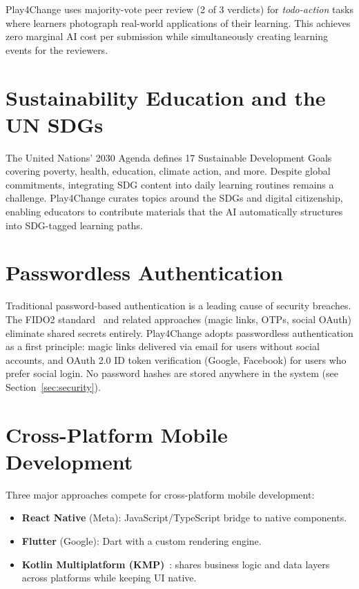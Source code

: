 Play4Change uses majority-vote peer review (2 of 3 verdicts) for \emph{todo-action} tasks where learners photograph real-world applications of their learning. This achieves zero marginal AI cost per submission while simultaneously creating learning events for the reviewers.

\section{Sustainability Education and the UN SDGs}
\label{sec:sdgs}

The United Nations' 2030 Agenda defines 17 Sustainable Development Goals~\cite{unsdgs2015} covering poverty, health, education, climate action, and more. Despite global commitments, integrating SDG content into daily learning routines remains a challenge. Play4Change curates topics around the SDGs and digital citizenship, enabling educators to contribute materials that the AI automatically structures into SDG-tagged learning paths.

\section{Passwordless Authentication}
\label{sec:passwordless}

Traditional password-based authentication is a leading cause of security breaches. The FIDO2 standard~\cite{fido2} and related approaches (magic links, OTPs, social OAuth) eliminate shared secrets entirely. Play4Change adopts passwordless authentication as a first principle: magic links delivered via email for users without social accounts, and OAuth 2.0 ID token verification (Google, Facebook) for users who prefer social login. No password hashes are stored anywhere in the system (see Section~\ref{sec:security}).

\section{Cross-Platform Mobile Development}
\label{sec:crossplatform}

Three major approaches compete for cross-platform mobile development:

\begin{itemize}
    \item \textbf{React Native} (Meta): JavaScript/TypeScript bridge to native components.
    \item \textbf{Flutter} (Google): Dart with a custom rendering engine.
    \item \textbf{Kotlin Multiplatform (KMP)}~\cite{kotlinmultiplatform2024}: shares business logic and data layers across platforms while keeping UI native.
\end{itemize}


